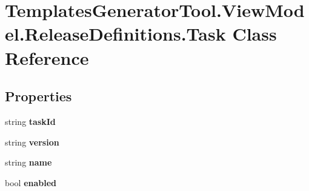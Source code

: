 \hypertarget{class_templates_generator_tool_1_1_view_model_1_1_release_definitions_1_1_task}{}\section{Templates\+Generator\+Tool.\+View\+Model.\+Release\+Definitions.\+Task Class Reference}
\label{class_templates_generator_tool_1_1_view_model_1_1_release_definitions_1_1_task}
\subsection*{Properties}
\begin{DoxyCompactItemize}
\item 
\mbox{\label{class_templates_generator_tool_1_1_view_model_1_1_release_definitions_1_1_task_a8abbd9e75d4b02b29b85822e32b4bfe2}} 
string {\bfseries task\+Id}
\item 
\mbox{\label{class_templates_generator_tool_1_1_view_model_1_1_release_definitions_1_1_task_a163208fed7092d1ec2aa6c7497d0f53b}} 
string {\bfseries version}
\item 
\mbox{\label{class_templates_generator_tool_1_1_view_model_1_1_release_definitions_1_1_task_a5a638f694776215e250ada038ecfb958}} 
string {\bfseries name}
\item 
\mbox{\label{class_templates_generator_tool_1_1_view_model_1_1_release_definitions_1_1_task_acf1b0977a474dfc7634cf282edd4bf27}} 
bool {\bfseries enabled}
\item 
\mbox{\label{class_templates_generator_tool_1_1_view_model_1_1_release_definitions_1_1_task_a959daebdcca103882c539a5f1aef5d34}} 

\end{DoxyCompactItemize}
